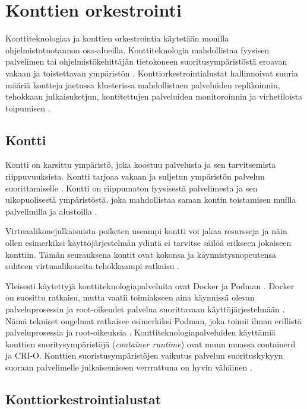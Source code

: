 \chapter{Konttien orkestrointi\label{orchestration}}

Konttiteknologiaa ja konttien orkestrointia käytetään monilla ohjelmistotuotannon osa-alueilla.
Konttiteknologia mahdollistaa fyysisen palvelimen tai ohjelmistökehittäjän tietokoneen suoritusympäristöstä eroavan vakaan ja toistettavan ympäristön \cite{Watada19}.
Konttiorkestrointialustat hallinnoivat suuria määriä kontteja jaetussa klusterissa mahdollistaen palveluiden replikoinnin, tehokkaan julkaisuketjun, kontitettujen palveluiden monitoroinnin ja virhetiloista toipumisen \cite{Khan17}.

\section{Kontti\label{container}}

Kontti on karsittu ympäristö, joka koostuu palvelusta ja sen tarvitsemista riippuvuuksista.
Kontti tarjoaa vakaan ja suljetun ympäristön palvelun suorittamiselle \cite{Watada19}.
Kontti on riippumaton fyysisestä palvelimesta ja sen ulkopuolisestä ympäristöstä, joka mahdollistaa saman kontin toistamisen muilla palvelimilla ja alustoilla \cite{Saha18}.

Virtuaalikonejulkaisuista poiketen useampi kontti voi jakaa resursseja ja näin ollen esimerkiksi käyttöjärjestelmän ydintä ei tarvitse säilöä erikseen jokaiseen konttiin.
Tämän seurauksena kontit ovat kokonsa ja käynnistysnopeutensa suhteen virtuaalikoneita tehokkaampi ratkaisu \cite{Dua14}.

Yleisesti käytettyjä konttiteknologiapalveluita ovat Docker ja Podman \cite{Abraham20, Bernstein14}.
Docker on suosittu ratkaisu, mutta vaatii toimiakseen aina käynnissä olevan palveluprosessin ja root-oikeudet palvelua suorittavaan käyttöjärjestelmään \cite{Abraham20}.
Nämä tekniset ongelmat ratkaisee esimerkiksi Podman, joka toimii ilman erillistä palveluprosessia ja root-oikeuksia \cite{Gantikow20}.
Konttiteknologiapalveluiden käyttämiä konttien suoritysympäristöjä (\textit{container runtime}) ovat muun muassa containerd ja CRI-O.
Konttien suoristusympäristöjen vaikutus palvelun suorituskykyyn suoraan palvelimelle julkaisemiseen verrrattuna on hyvin vähäinen \cite{torrez19, espe20}.

\section{Konttiorkestrointialustat\label{platforms}}

